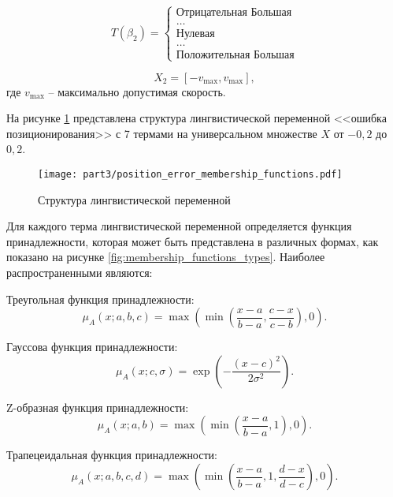 \begin{equation*}
	T(\beta_2) =\begin{cases}
		\text{Отрицательная Большая} \\
		\ldots \\
		\text{Нулевая} \\
		\ldots \\
		\text{Положительная Большая}
		\end{cases}
\end{equation*}

\begin{equation*}
X_2 = [-v_{\text{max}}, v_{\text{max}}],
\end{equation*}
где $v_{\text{max}}$ -- максимально допустимая скорость.

На рисунке \ref{fig:linguistic_variable_structure} представлена структура лингвистической переменной
<<ошибка позиционирования>> с
7 термами на универсальном множестве $X$ от $-0,2$ до $0,2$.

\begin{figure}[ht]
\centering
\texttt{[image: part3/position\_error\_membership\_functions.pdf]}
\caption{Структура лингвистической переменной}
\label{fig:linguistic_variable_structure}
\end{figure}

Для каждого терма лингвистической переменной определяется функция принадлежности,
которая может быть представлена в различных формах,
как показано на рисунке \ref{fig:membership_functions_types}.
Наиболее распространенными являются:

Треугольная функция принадлежности:
\begin{equation*}
\mu_A(x; a, b, c) = \max\left(\min\left(\frac{x-a}{b-a}, \frac{c-x}{c-b}\right), 0\right).
\end{equation*}

Гауссова функция принадлежности:
\begin{equation*}
\mu_A(x; c, \sigma) = \exp\left(-\frac{(x-c)^2}{2\sigma^2}\right).
\end{equation*}

Z-образная функция принадлежности:
\begin{equation*}
\mu_A(x; a, b) = \max\left(\min\left(\frac{x-a}{b-a}, 1\right), 0\right).
\end{equation*}

Трапецеидальная функция принадлежности:
\begin{equation*}
\mu_A(x; a, b, c, d) = \max\left(\min\left(\frac{x-a}{b-a}, 1, \frac{d-x}{d-c}\right), 0\right).
\end{equation*}

